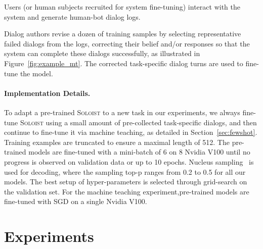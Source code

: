 \documentclass[11pt,a4paper]{article}
\newcommand{\model}{\textsc{Soloist}}
\begin{document}
Users (or human subjects recruited for system fine-tuning) interact with the system and generate human-bot dialog logs.

Dialog authors revise a dozen of training samples by selecting
representative failed dialogs from the logs, correcting their belief and/or responses so that the system can complete these dialogs successfully, as illustrated in Figure~\ref{fig:example_mt}.
The corrected task-specific dialog turns are used to fine-tune the model. 


\paragraph{Implementation Details.} 
To adapt a pre-trained \model{} to a new task in our experiments, we always fine-tune \model{} using a small amount of pre-collected task-specific dialogs, and then continue to fine-tune it via machine teaching, as detailed in Section~\ref{sec:fewshot}. 
Training examples are truncated to ensure a maximal length of 512. The pre-trained models are fine-tuned with a mini-batch of 6 on 8 Nvidia V100 until no progress is observed on validation data or up to 10 epochs. Nucleus sampling~\cite{holtzman2019curious} is used for decoding, where the sampling top-p ranges from 0.2 to 0.5 for all our models. The best setup of hyper-parameters is selected through grid-search on the validation set. For the machine teaching experiment,pre-trained models are fine-tuned with SGD on a single Nvidia V100.

\section{Experiments}
\end{document}
